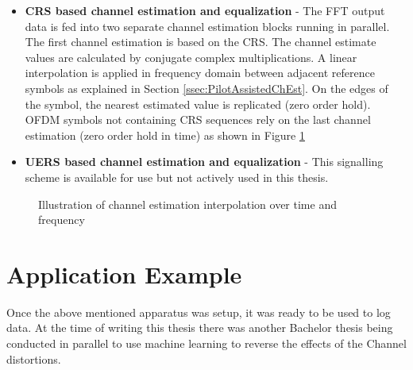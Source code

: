 \begin{itemize}
    \item \textbf{CRS based channel estimation and equalization} -
        The FFT output data is fed into two separate channel estimation blocks running in parallel. The first channel estimation is based on the CRS. The channel estimate values are calculated by conjugate complex multiplications. A linear interpolation is applied in frequency domain between adjacent reference symbols as explained in Section \ref{ssec:PilotAssistedChEst}. On the edges of the symbol, the nearest estimated value is replicated (zero order hold). OFDM symbols not containing CRS sequences rely on the last channel estimation (zero order hold in time) as shown in Figure \ref{fig:ChEstInterpolation}
    \item \textbf{UERS based channel estimation and equalization} -
        This signalling scheme is available for use but not actively used in this thesis.
\end{itemize}

\begin{figure}%
    \centering
    \qquad
    \caption{Illustration of channel estimation interpolation over time and frequency}%
    \label{fig:ChEstInterpolation}%
\end{figure}

\section{Application Example}\label{sec:AppEx}

Once the above mentioned apparatus was setup, it was ready to be used to log data. At the time of writing this thesis there was another Bachelor thesis being conducted in parallel to use machine learning to reverse the effects of the Channel distortions.

